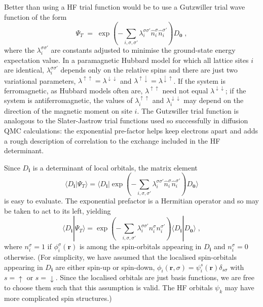 \documentclass{article}
\newcommand{\bi}{\boldsymbol{i}}
\newcommand{\bzero}{\boldsymbol{0}}
\newcommand{\br}{\boldsymbol{r}}
\begin{document}
Better than using a HF trial function would be to use a Gutzwiller
trial wave function of the form
\begin{displaymath}
\Psi_T \; = \; \exp \left ( - \sum_{i,\sigma,\sigma'}
\lambda_{i}^{\sigma\sigma'} \hat{n}_i^{\sigma} \hat{n}_i^{\sigma'}
\right ) D_{\bzero} \;,
\end{displaymath}
where the $\lambda_{i}^{\sigma\sigma'}$ are constants adjusted to
minimise the ground-state energy expectation value. In a paramagnetic
Hubbard model for which all lattice sites $i$ are identical,
$\lambda_i^{\sigma\sigma'}$ depends only on the relative spins and
there are just two variational parameters, $\lambda^{\uparrow\uparrow}
= \lambda^{\downarrow\downarrow}$ and
$\lambda^{\uparrow\downarrow}=\lambda^{\downarrow\uparrow}$.  If the
system is ferromagnetic, as Hubbard models often are,
$\lambda^{\uparrow\uparrow}$ need not equal
$\lambda^{\downarrow\downarrow}$; if the system is antiferromagnetic,
the values of $\lambda_i^{\uparrow\uparrow}$ and
$\lambda_i^{\downarrow\downarrow}$ may depend on the direction of the
magnetic moment on site $i$. The Gutzwiller trial function is
analogous to the Slater-Jastrow trial functions used so successfully
in diffusion QMC calculations: the exponential pre-factor helps keep
electrons apart and adds a rough description of correlation to the
exchange included in the HF determinant.

Since $D_{\bi}$ is a determinant of local orbitals, the matrix element
\begin{displaymath}
\langle D_{\bi} | \Psi_T \rangle = 
\langle D_{\bi} | \exp ( - {\textstyle \sum_{i,\sigma,\sigma'}}
\lambda_{i}^{\sigma\sigma'} \hat{n}_i^{\sigma} \hat{n}_i^{\sigma'}
) D_{\bzero} \rangle
\end{displaymath}
is easy to evaluate. The exponential prefactor is a Hermitian operator
and so may be taken to act to its left, yielding
\begin{displaymath}
\langle D_{\bi} | \Psi_T \rangle =
\exp ( - {\textstyle \sum_{i,\sigma,\sigma'}}
\lambda_{i}^{\sigma\sigma'} {n}_i^{\sigma} {n}_i^{\sigma'} )
\langle D_{\bi} | D_{\bzero} \rangle \;,
\end{displaymath}
where $n_i^{\sigma}=1$ if $\phi_{i}^{\sigma}(\br)$ is among the
spin-orbitals appearing in $D_{\bi}$ and $n_i^{\sigma}=0$
otherwise. (For simplicity, we have assumed that the localised
spin-orbitals appearing in $D_{\bi}$ are either spin-up or spin-down,
$\phi_i(\br,\sigma) = \psi_i^{s}(\br)\delta_{s\sigma}$ with $s =
\uparrow$ or $s = \downarrow$. Since the localised orbitals are just
basis functions, we are free to choose them such that this assumption
is valid. The HF orbitals $\psi_k$ may have more complicated spin
structures.)
\end{document}
